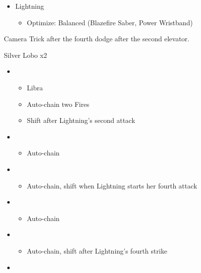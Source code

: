 \begin{paracol}{2}
\begin{menu}
\begin{itemize}
\begin{itemize}
\begin{itemize}
\begin{itemize}
					            \end{itemize}
				      \end{itemize}
			\end{itemize}
			\equip
			\begin{itemize}
				\item Lightning
				      \begin{itemize}
					      \item Optimize: Balanced (Blazefire Saber, Power Wristband)
				      \end{itemize}
			\end{itemize}
		\end{itemize}
	\end{menu}
	\switchcolumn*
	Camera Trick after the fourth dodge after the second elevator.

	\begin{battle}{Silver Lobo x2}
		\begin{itemize}
			\item \first
			      \begin{itemize}
				      \item Libra
				      \item Auto-chain two Fires
				      \item Shift after Lightning's second attack
			      \end{itemize}
			\item \fourth
			      \begin{itemize}
				      \item Auto-chain
			      \end{itemize}
			\item \sixth
			      \begin{itemize}
				      \item Auto-chain, shift when Lightning starts her fourth attack
			      \end{itemize}
			\item \first
			      \begin{itemize}
				      \item Auto-chain
			      \end{itemize}
			\item \fourth
			      \begin{itemize}
				      \item Auto-chain, shift after Lightning's fourth strike
			      \end{itemize}
			\item \sixth
			      \begin{itemize}

\end{itemize}
\end{itemize}
\end{battle}
\end{paracol}
